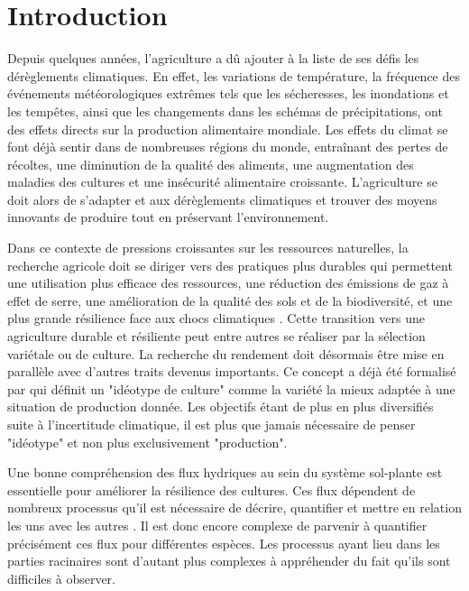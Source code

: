\section*{Introduction}

Depuis quelques années, l’agriculture a dû ajouter à la liste de ses défis les dérèglements climatiques.
En effet, les variations de température, la fréquence des événements météorologiques extrêmes tels que les sécheresses, les inondations et les tempêtes, ainsi que les changements dans les schémas de précipitations, ont des effets directs sur la production alimentaire mondiale.
Les effets du climat se font déjà sentir dans de nombreuses régions du monde, entraînant des pertes de récoltes, une diminution de la qualité des aliments, une augmentation des maladies des cultures et une insécurité alimentaire croissante.
L’agriculture se doit alors de s’adapter et aux dérèglements climatiques et trouver des moyens innovants de produire tout en préservant l’environnement. 
\newline

Dans ce contexte de pressions croissantes sur les ressources naturelles, la recherche agricole doit se diriger vers des pratiques plus durables qui permettent une utilisation plus efficace des ressources, une réduction des émissions de gaz à effet de serre, une amélioration de la qualité des sols et de la biodiversité, et une plus grande résilience face aux chocs climatiques \citep{oecd_building_2021}.
Cette transition vers une agriculture durable et résiliente peut entre autres se réaliser par la sélection variétale ou de culture.
La recherche du rendement doit désormais être mise en parallèle avec d'autres traits devenus importants.
Ce concept a déjà été formalisé par \cite{donald_breeding_1968} qui définit un "idéotype de culture" comme la variété la mieux adaptée à une situation de production donnée.
Les objectifs étant de plus en plus diversifiés suite à l'incertitude climatique, il est plus que jamais nécessaire de penser "idéotype" et non plus exclusivement "production".
\newline

Une bonne compréhension des flux hydriques au sein du système sol-plante est essentielle pour améliorer la résilience des cultures. Ces flux dépendent de nombreux processus qu'il est nécessaire de décrire, quantifier et mettre en relation les uns avec les autres \citep{lobet_plant_2014}. 
Il est donc encore complexe de parvenir à quantifier précisément ces flux pour différentes espèces. Les processus ayant lieu dans les parties racinaires sont d'autant plus complexes à appréhender du fait qu'ils sont difficiles à observer. 
\newline
 
